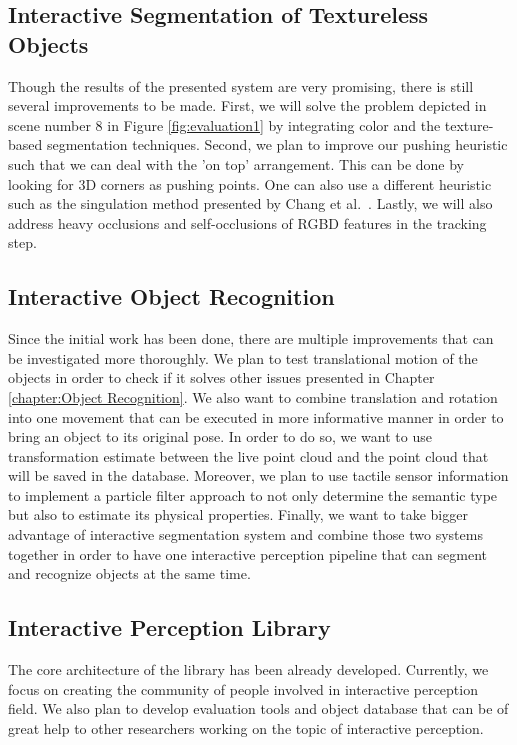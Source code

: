 \subsection{Interactive Segmentation of Textureless Objects}
Though the results of the presented system are very promising, there is still several improvements to be made. First, we
will solve the problem depicted in scene number 8 in Figure \ref{fig:evaluation1} by integrating color and the texture-based segmentation techniques.
Second, we plan to improve our pushing heuristic such that we
can deal with the ’on top’ arrangement. This can be done by
looking for 3D corners as pushing points. One can also use a
different heuristic such as the singulation method presented by
Chang et al.~\cite{chang11interactive}. Lastly, we will also address heavy occlusions
and self-occlusions of RGBD features in the tracking step.


\subsection{Interactive Object Recognition}
Since the initial work has been done, there are multiple improvements that can be investigated more thoroughly. We plan to test translational motion of the objects in order to check if it solves other issues presented in Chapter \ref{chapter:Object Recognition}. We also want to combine translation and rotation into one movement that can be executed in more informative manner in order to bring an object to its original pose. In order to do so, we want to use transformation estimate between the live point cloud and the point cloud that will be saved in the database. Moreover, we plan to use tactile sensor information to implement a particle filter approach to not only determine the semantic type but also to estimate its physical properties. Finally, we want to take bigger advantage of interactive segmentation system and combine those two systems together in order to have one interactive perception pipeline that can segment and recognize objects at the same time. 


\subsection{Interactive Perception Library}
The core architecture of the library has been already developed. Currently, we focus on creating the community of people involved in interactive perception field. We also plan to develop evaluation tools and object database that can be of great help to other researchers working on the topic of interactive perception.